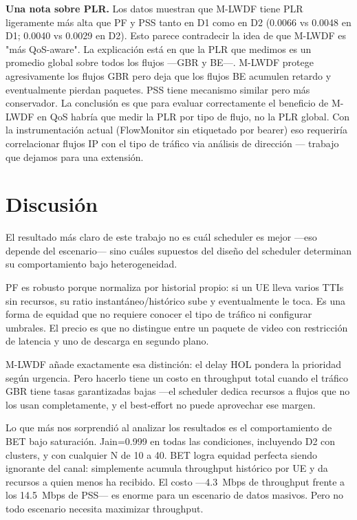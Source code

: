 \documentclass[conference]{IEEEtran}
\begin{document}
\textbf{Una nota sobre PLR.} Los datos muestran que M-LWDF tiene PLR ligeramente más
alta que PF y PSS tanto en D1 como en D2 (0.0066 vs 0.0048 en D1; 0.0040 vs 0.0029
en D2). Esto parece contradecir la idea de que M-LWDF es "más QoS-aware". La
explicación está en que la PLR que medimos es un promedio global sobre todos los flujos
---GBR y BE---. M-LWDF protege agresivamente los flujos GBR pero deja que los flujos
BE acumulen retardo y eventualmente pierdan paquetes. PSS tiene mecanismo similar pero
más conservador. La conclusión es que para evaluar correctamente el beneficio de
M-LWDF en QoS habría que medir la PLR por tipo de flujo, no la PLR global. Con la
instrumentación actual (FlowMonitor sin etiquetado por bearer) eso requeriría correlacionar
flujos IP con el tipo de tráfico via análisis de dirección --- trabajo que dejamos para
una extensión.

\section{Discusión}
\label{sec:discusion}

El resultado más claro de este trabajo no es cuál scheduler es mejor ---eso depende
del escenario--- sino cuáles supuestos del diseño del scheduler determinan su
comportamiento bajo heterogeneidad.

PF es robusto porque normaliza por historial propio: si un UE lleva varios TTIs sin
recursos, su ratio instantáneo/histórico sube y eventualmente le toca. Es una forma
de equidad que no requiere conocer el tipo de tráfico ni configurar umbrales.
El precio es que no distingue entre un paquete de video con restricción de latencia
y uno de descarga en segundo plano.

M-LWDF añade exactamente esa distinción: el delay HOL pondera la prioridad según
urgencia. Pero hacerlo tiene un costo en throughput total cuando el tráfico GBR
tiene tasas garantizadas bajas ---el scheduler dedica recursos a flujos que no los
usan completamente, y el best-effort no puede aprovechar ese margen.

Lo que más nos sorprendió al analizar los resultados es el comportamiento de BET
bajo saturación. Jain=0.999 en todas las condiciones, incluyendo D2 con clusters, y
con cualquier N de 10 a 40. BET logra equidad perfecta siendo ignorante del canal:
simplemente acumula throughput histórico por UE y da recursos a quien menos ha recibido.
El costo ---4.3~Mbps de throughput frente a los 14.5~Mbps de PSS--- es enorme para
un escenario de datos masivos. Pero no todo escenario necesita maximizar throughput.
\end{document}
